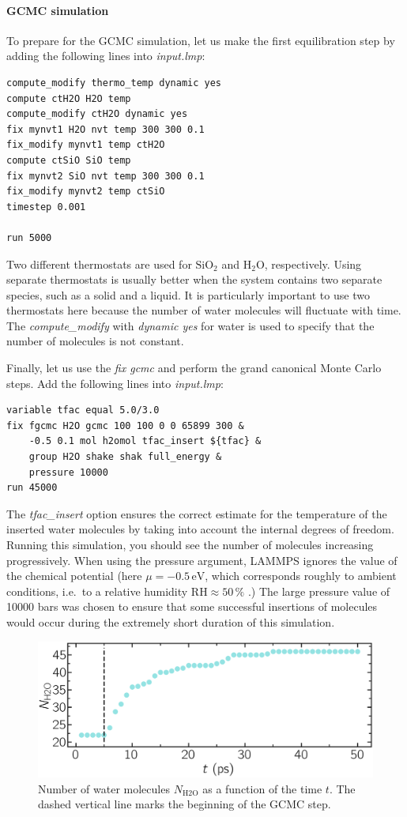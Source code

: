 \documentclass[9pt,tutorial]{livecoms}
\begin{document}
\paragraph{GCMC simulation}
To prepare for the GCMC simulation, let us make the first equilibration step by
adding the following lines into \textit{input.lmp}:
\begin{lstlisting}
compute_modify thermo_temp dynamic yes
compute ctH2O H2O temp
compute_modify ctH2O dynamic yes
fix mynvt1 H2O nvt temp 300 300 0.1
fix_modify mynvt1 temp ctH2O
compute ctSiO SiO temp
fix mynvt2 SiO nvt temp 300 300 0.1
fix_modify mynvt2 temp ctSiO
timestep 0.001

run 5000
\end{lstlisting}
Two different thermostats are used for $\text{SiO}_2$ and $\text{H}_2\text{O}$,
respectively. Using separate thermostats is usually better when the system contains
two separate species, such as a solid and a liquid. It is particularly important
to use two thermostats here because the number of water molecules will fluctuate
with time. The \textit{compute\_modify} with \textit{dynamic yes} for water is
used to specify that the number of molecules is not constant.

Finally, let us use the \textit{fix gcmc} and perform the grand canonical Monte
Carlo steps. Add the following lines into \textit{input.lmp}:
\begin{lstlisting}
variable tfac equal 5.0/3.0
fix fgcmc H2O gcmc 100 100 0 0 65899 300 &
    -0.5 0.1 mol h2omol tfac_insert ${tfac} &
    group H2O shake shak full_energy &
    pressure 10000
run 45000
\end{lstlisting}
The \textit{tfac\_insert} option ensures the correct estimate for the temperature
of the inserted water molecules by taking into account the internal degrees of
freedom. Running this simulation, you should see the number of molecules increasing
progressively. When using the pressure argument, LAMMPS ignores the value of the
chemical potential (here $\mu = -0.5\,\text{eV}$, which corresponds roughly to
ambient conditions, i.e.~to a relative humidity $\text{RH} \approx 50\,\%$ \cite{gravelle2020multi}.)
The large pressure value of 10000 bars was chosen to ensure that some successful
insertions of molecules would occur during the extremely short duration of this simulation.

\begin{figure}
\centering
\includegraphics[width=\linewidth]{GCMC-number}
\caption{Number of water molecules $N_\text{H2O}$ as a function of the time $t$.
The dashed vertical line marks the beginning of the GCMC step.}
\label{fig:GCMC-number}
\end{figure}
\end{document}
